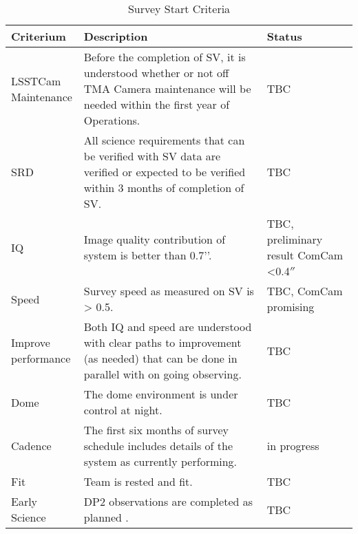 \begin{table}[]
\renewcommand{\arraystretch}{2}
\small
\centering
\caption{Survey Start Criteria}\label{tab:criteria}
\begin{tabular}{|p{1in}|p{4in}|p{1.0in}|}
\hline
Criterium & Description& Status \\
\hline \hline

\makecell[l]{LSSTCam\\ Maintenance} & Before the completion of SV, it is understood whether or not off TMA Camera maintenance will be needed within the first year of Operations.& TBC \\\hline  
SRD &All science requirements that can be verified with SV data are verified or expected to be verified within 3 months of completion of SV. & TBC \\\hline
IQ& Image quality contribution of system is better than 0.7’’. & \makecell[l]{TBC, \\preliminary \\result \\ComCam <0.4$''$}\\\hline
Speed & Survey speed as measured on SV is > 0.5. & TBC, ComCam promising\\\hline
\makecell[l]{Improve\\ performance} & Both IQ and speed are understood with clear paths to improvement (as needed) that can be done in parallel with on going observing.& TBC \\\hline
Dome & The dome environment is under control at night. & TBC\\\hline
Cadence& The first six months of survey schedule includes details of the system as currently performing.& in progress\\\hline
Fit & Team is rested and fit. & TBC\\\hline
Early Science&DP2 observations are completed as planned \citep{RTN-011}.& TBC \\

\hline
\end{tabular}
\end{table}


